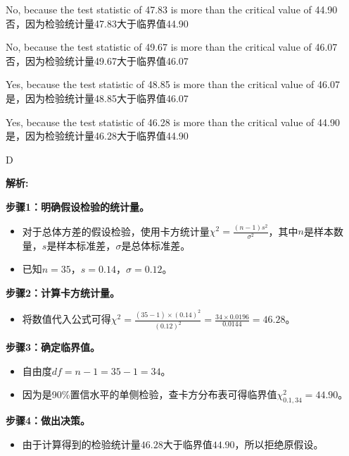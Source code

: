 \documentclass{article}
\newenvironment{explanation}
{\textbf{解析:}\par}
{\par}
\begin{document}
    \begin{choices}
        \item No, because the test statistic of 47.83 is more than the critical value of 44.90\\
        否，因为检验统计量47.83大于临界值44.90
        \item No, because the test statistic of 49.67 is more than the critical value of 46.07\\
        否，因为检验统计量49.67大于临界值46.07
        \item Yes, because the test statistic of 48.85 is more than the critical value of 46.07\\
        是，因为检验统计量48.85大于临界值46.07
        \item Yes, because the test statistic of 46.28 is more than the critical value of 44.90\\
        是，因为检验统计量46.28大于临界值44.90
    \end{choices}
    
    \begin{correctanswer}
        D
    \end{correctanswer}
    
    \begin{explanation}
    \textbf{步骤1：明确假设检验的统计量。}
    \begin{itemize}
        \item 对于总体方差的假设检验，使用卡方统计量\(\chi^{2}=\frac{(n - 1)s^{2}}{\sigma^{2}}\)，其中\(n\)是样本数量，\(s\)是样本标准差，\(\sigma\)是总体标准差。
        \item 已知\(n = 35\)，\(s=0.14\)，\(\sigma = 0.12\)。
    \end{itemize}
    \textbf{步骤2：计算卡方统计量。}
    \begin{itemize}
        \item 将数值代入公式可得\(\chi^{2}=\frac{(35 - 1)\times(0.14)^{2}}{(0.12)^{2}}=\frac{34\times0.0196}{0.0144}=46.28\)。
    \end{itemize}
    \textbf{步骤3：确定临界值。}
    \begin{itemize}
        \item 自由度\(df=n - 1=35 - 1 = 34\)。
        \item 因为是90\%置信水平的单侧检验，查卡方分布表可得临界值\(\chi_{0.1,34}^{2}=44.90\)。
    \end{itemize}
    \textbf{步骤4：做出决策。}
    \begin{itemize}
        \item 由于计算得到的检验统计量\(46.28\)大于临界值\(44.90\)，所以拒绝原假设。
    \end{itemize}
    \end{explanation}
    
\end{document}
